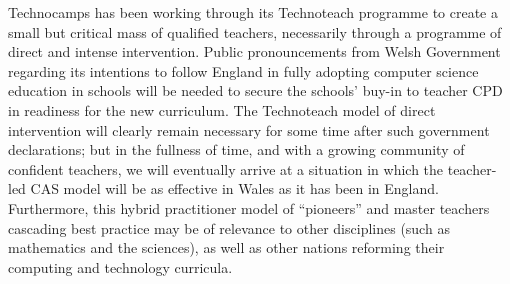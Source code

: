 \documentclass{llncs}
\begin{document}
Technocamps has been working through its Technoteach programme to
create a small but critical mass of qualified teachers,
necessarily through a programme of direct and intense intervention.
Public pronouncements from Welsh Government regarding its intentions
to follow England in fully adopting computer science education in schools
will be needed to secure the schools' buy-in to teacher CPD in
readiness for the new curriculum.  The Technoteach model of direct
intervention will clearly remain necessary for some time after such
government declarations; but in the fullness of time, and with a
growing community of confident teachers, we will eventually arrive at
a situation in which the teacher-led CAS model will be as effective in
Wales as it has been in England. Furthermore, this hybrid practitioner
model of ``pioneers'' and master teachers cascading best practice may
be of relevance to other disciplines (such as mathematics and the
sciences), as well as other nations reforming their computing and
technology curricula.






\end{document}
